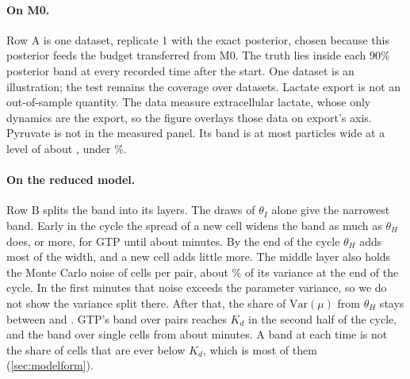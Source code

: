 \paragraph{On M0.} Row A is one dataset, replicate 1 with the exact posterior, chosen
because this posterior feeds the budget transferred from M0. The truth lies inside each 90\%
posterior band at every recorded time after the start. One dataset is an illustration;
the test remains the coverage over  datasets. Lactate export is not an
out-of-sample quantity. The data measure extracellular lactate, whose only dynamics are
the export, so the figure overlays those data on export's axis. Pyruvate is not in the
measured panel. Its band is at most  particles wide at a level of
about , under \%.

\paragraph{On the reduced model.} Row B splits the band into its layers. The draws of
$\theta_I$ alone give the narrowest band. Early in the cycle the spread of a new cell
widens the band as much as $\theta_H$ does, or more, for GTP until about
 minutes. By the end of the cycle $\theta_H$ adds most of the width,
and a new cell adds little more. The middle layer also holds the Monte Carlo noise of
 cells per pair, about \% of its variance at the end
of the cycle. In the first  minutes that noise exceeds the parameter
variance, so we do not show the variance split there. After that, the share of
$\mathrm{Var}(\mu)$ from $\theta_H$ stays between  and
. GTP's band over pairs reaches $K_d$ in the second half of the cycle,
and the band over single cells from about  minutes. A band at each time
is not the share of cells that are ever below $K_d$, which is most of them
(\cref{sec:modelform}).

